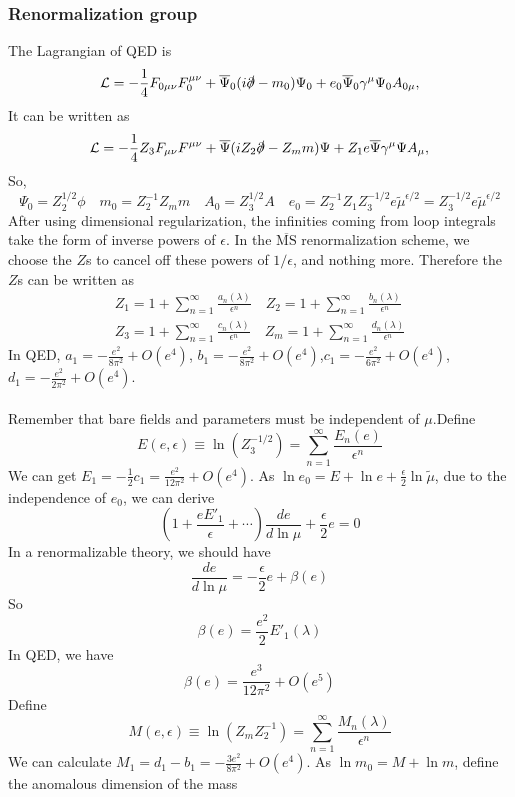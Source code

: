 \subsubsection{Renormalization group}
\noindent
The Lagrangian of QED is
\[\mathcal{L} = -\frac{1}{4}F_{0\mu\nu}F_0^{\mu\nu} + \overline{\Psi}_0 (i\slashed{\partial}-m_0) \Psi_0 + e_0\overline{\Psi}_0\gamma^{\mu}\Psi_0 A_{0\mu}, \]
It can be written as
\[\mathcal{L} = -\frac{1}{4} Z_3 F_{\mu\nu}F^{\mu\nu} + \overline{\Psi} (iZ_2 \slashed{\partial}-Z_m m) \Psi + Z_1 e\overline{\Psi}\gamma^{\mu}\Psi A_{\mu}, \]
So,
\[\Psi_0 = Z_{2}^{1/2}\phi \quad m_0 = Z_{2}^{-1} Z_{m}m \quad A_0 = Z_3^{1/2}A \quad e_0 = Z_{2}^{-1}Z_1 Z_{3}^{-1/2} e \tilde{\mu}^{\epsilon/2} = Z_{3}^{-1/2} e \tilde{\mu}^{\epsilon/2}\]
After using dimensional regularization, the infinities coming from loop integrals take the form of inverse powers of $\epsilon$. In the  $\mathrm{\overline{MS}}$ renormalization scheme, we choose the $Z$s to cancel off these powers of $1/\epsilon$, and nothing more. Therefore the $Z$s can be written as
\begin{eqnarray}
Z_{1} = 1 + \sum_{n=1}^{\infty} \frac{a_n(\lambda)}{\epsilon^n} \quad Z_{2} = 1 + \sum_{n=1}^{\infty} \frac{b_n(\lambda)}{\epsilon^n} \nonumber \\
Z_{3} = 1 + \sum_{n=1}^{\infty} \frac{c_n(\lambda)}{\epsilon^n} \quad Z_{m} = 1 + \sum_{n=1}^{\infty} \frac{d_n(\lambda)}{\epsilon^n} \nonumber 
\end{eqnarray}
In QED, $a_1 = -\frac{e^2}{8\pi^2} + O(e^4)$, $b_1 = -\frac{e^2}{8\pi^2} + O(e^4)$,$c_1 = -\frac{e^2}{6\pi^2} + O(e^4)$,$d_1 = -\frac{e^2}{2\pi^2} + O(e^4)$.
\\ \\
Remember that bare fields and parameters must be independent of $\mu$.Define
\[E(e,\epsilon) \equiv \ln(Z_3^{-1/2}) = \sum_{n=1}^{\infty} \frac{E_n(e)}{\epsilon^n}\]
We can get $E_1 = -\frac{1}{2}c_1 = \frac{e^2}{12\pi^2} + O(e^4)$.
As $\ln e_0 = E + \ln e + \frac{\epsilon}{2} \ln \tilde{\mu} $, due to the independence of $e_0$, we can derive
\[\left ( 1 + \frac{e E'_1}{\epsilon} + \cdots \right) \frac{d e}{d\ln \mu} + \frac{\epsilon}{2} e = 0\]
In a renormalizable theory, we should have
\[\frac{d e}{d\ln\mu} = -\frac{\epsilon}{2} e + \beta(e)\]
So
\[\beta(e) = \frac{e^2}{2} E'_1(\lambda)\]
In QED, we have
\[\beta(e) = \frac{e^3}{12\pi^2} + O(e^5)\]
Define
\[M(e,\epsilon) \equiv \ln(Z_{m} Z_{2}^{-1}) = \sum_{n=1}^{\infty} \frac{M_n(\lambda)}{\epsilon^n}\]
We can calculate $M_1 = d_1 - b_1 = -\frac{3e^2}{8\pi^2} + O(e^4)$.
As $\ln m_0 = M + \ln m $, define the anomalous dimension of the mass
